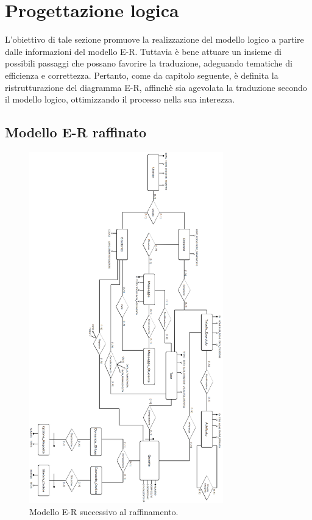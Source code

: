 \documentclass{article}
\begin{document}
\newpage
\section{Progettazione logica}
\large
L'obiettivo di tale sezione promuove la realizzazione del modello logico a partire dalle informazioni del modello E-R. Tuttavia è bene attuare un insieme di possibili passaggi che possano favorire la traduzione, adeguando tematiche di efficienza e correttezza. Pertanto, come da capitolo seguente, è definita la ristrutturazione del diagramma E-R, affinchè sia agevolata la traduzione secondo il modello logico, ottimizzando il processo nella sua interezza.

\subsection{Modello E-R raffinato}
\large
\begin{figure}[H]
    \includegraphics*[width=0.75\textwidth]{foto2.png}
    \caption{Modello E-R successivo al raffinamento.}
\end{figure}
\end{document}
